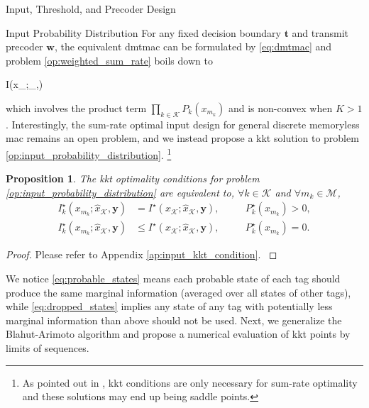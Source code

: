 \documentclass[journal]{IEEEtran}
\newtheorem{proposition}{Proposition}
\begin{document}
\begin{section}{Input, Threshold, and Precoder Design}
	\begin{subsection}{Input Probability Distribution}
		For any fixed decision boundary $\boldsymbol{t}$ and transmit precoder $\boldsymbol{w}$, the equivalent \gls{dmtmac} can be formulated by \eqref{eq:dmtmac} and problem \eqref{op:weighted_sum_rate} boils down to
		\begin{maxi!}
			{}{I(x_{};_{},)}{\label{op:input_probability_distribution}}{}
			\addConstraint{\eqref{co:sum_probability},\eqref{co:nonnegative_probability},}
		\end{maxi!}
		which involves the product term $\prod_{k \in \mathcal{K}} P_k(x_{m_k})$ and is non-convex when $K > 1$.
		Interestingly, the sum-rate optimal input design for general discrete memoryless \gls{mac} remains an open problem, and we instead propose a \gls{kkt} solution to problem \eqref{op:input_probability_distribution}.
		\footnote{
			As pointed out in \cite{Buhler2011}, \gls{kkt} conditions are only necessary for sum-rate optimality and these solutions may end up being saddle points.
		}
		\begin{proposition}
			The \gls{kkt} optimality conditions for problem \eqref{op:input_probability_distribution} are equivalent to, $\forall k \in \mathcal{K}$ and $\forall m_k \in \mathcal{M}$,
			\begin{subequations}
				\label{eq:input_kkt_condition}
				\begin{alignat}{2}
					I_k^\star(x_{m_k};\hat{x}_{\mathcal{K}},\boldsymbol{y}) & = I^\star(x_{\mathcal{K}};\hat{x}_{\mathcal{K}},\boldsymbol{y}), \quad   &  & P_k^\star(x_{m_k}) > 0,\label{eq:probable_states} \\
					I_k^\star(x_{m_k};\hat{x}_{\mathcal{K}},\boldsymbol{y}) & \le I^\star(x_{\mathcal{K}};\hat{x}_{\mathcal{K}},\boldsymbol{y}), \quad &  & P_k^\star(x_{m_k}) = 0.\label{eq:dropped_states}
				\end{alignat}
			\end{subequations}
			\label{pr:input_kkt_condition}
		\end{proposition}

		\begin{proof}
			Please refer to Appendix \ref{ap:input_kkt_condition}.
			\label{pf:input_kkt_condition}
		\end{proof}

		We notice \eqref{eq:probable_states} means each probable state of each tag should produce the same marginal information (averaged over all states of other tags), while \eqref{eq:dropped_states} implies any state of any tag with potentially less marginal information than above should not be used.
		Next, we generalize the Blahut-Arimoto algorithm \cite{Arimoto1972,Blahut1972a} and propose a numerical evaluation of \gls{kkt} points by limits of sequences.


\end{subsection}
\end{section}
\end{document}
